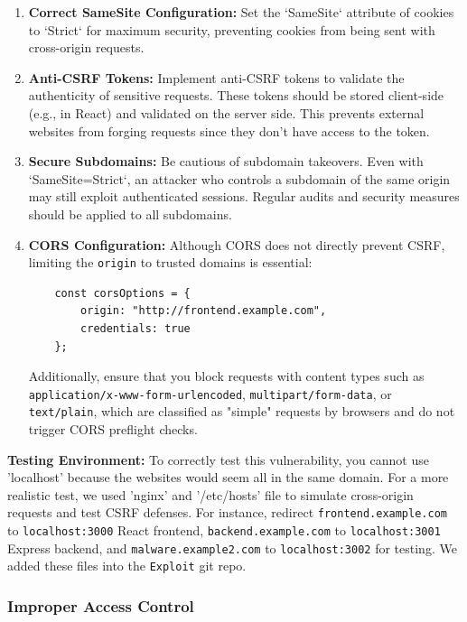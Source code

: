 \documentclass[]{article}
\begin{document}
\begin{enumerate}
    \item \textbf{Correct SameSite Configuration:}  
    Set the `SameSite` attribute of cookies to `Strict` for maximum security, preventing cookies from being sent with cross-origin requests.
    
    \item \textbf{Anti-CSRF Tokens:}  
    Implement anti-CSRF tokens to validate the authenticity of sensitive requests. These tokens should be stored client-side (e.g., in React) and validated on the server side. This prevents external websites from forging requests since they don't have access to the token.
    
    \item \textbf{Secure Subdomains:}  
    Be cautious of subdomain takeovers. Even with `SameSite=Strict`, an attacker who controls a subdomain of the same origin may still exploit authenticated sessions. Regular audits and security measures should be applied to all subdomains.
    
    \item \textbf{CORS Configuration:}  
    Although CORS does not directly prevent CSRF, limiting the \texttt{origin} to trusted domains is essential:
    \begin{lstlisting}
    const corsOptions = {
        origin: "http://frontend.example.com",
        credentials: true
    };
    \end{lstlisting}
    Additionally, ensure that you block requests with content types such as \texttt{application/x-www-form-urlencoded}, \texttt{multipart/form-data}, or \texttt{text/plain}, which are classified as "simple" requests by browsers and do not trigger CORS preflight checks.
\end{enumerate}
\textbf{Testing Environment:}
   To correctly test this vulnerability, you cannot use 'localhost' because the websites would seem all in the same domain. For a more realistic test, we used 'nginx' and '/etc/hosts' file to simulate cross-origin requests and test CSRF defenses. For instance, redirect \texttt{frontend.example.com} to \texttt{localhost:3000} React frontend, \texttt{backend.example.com} to \texttt{localhost:3001} Express backend, and \texttt{malware.example2.com} to \texttt{localhost:3002} for testing. We added these files into the \texttt{Exploit} git repo.


\subsubsection{Improper Access Control}
\label{subsubsec:improper_access_control}
\end{document}
